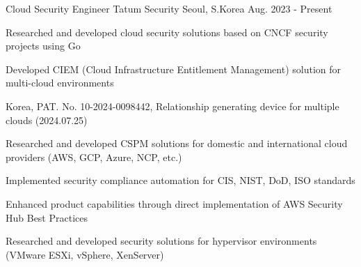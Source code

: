 
\begin{cventries}

\cventry
    {Cloud Security Engineer} %
    {Tatum Security} %
    {Seoul, S.Korea} %
    {Aug. 2023 - Present} %
    {
      \begin{cvitems} %
        \item {Researched and developed cloud security solutions based on CNCF security projects using Go}
        \item {Developed CIEM (Cloud Infrastructure Entitlement Management) solution for multi-cloud environments}
        \item {Korea, PAT. No. 10-2024-0098442, Relationship generating device for multiple clouds (2024.07.25)}
        \item {Researched and developed CSPM solutions for domestic and international cloud providers (AWS, GCP, Azure, NCP, etc.)}
        \item {Implemented security compliance automation for CIS, NIST, DoD, ISO standards}
        \item {Enhanced product capabilities through direct implementation of AWS Security Hub Best Practices}
        \item {Researched and developed security solutions for hypervisor environments (VMware ESXi, vSphere, XenServer)}
      \end{cvitems}
    }


\end{cventries}
